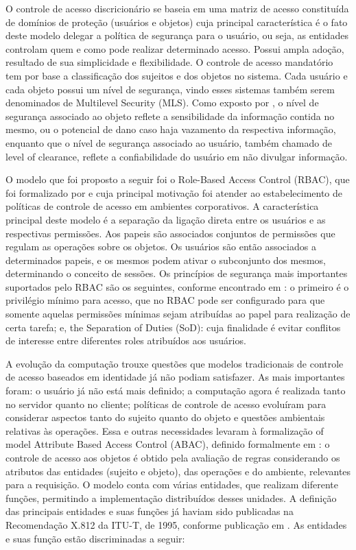 \documentclass{doublecol-new}
\begin{document}
O controle de acesso discricionário \cite{lampson1974protection} se baseia em uma matriz de acesso constituída de domínios de proteção (usuários e objetos) cuja principal característica é o fato deste modelo delegar a política de segurança para o usuário, ou seja, as entidades controlam quem e como pode realizar determinado acesso. Possui ampla adoção, resultado de sua simplicidade e flexibilidade. O controle de acesso mandatório tem por base a classificação dos sujeitos e dos objetos no sistema. Cada usuário e cada objeto possui um nível de segurança, vindo esses sistemas também serem denominados de Multilevel Security (MLS). Como exposto por \cite{sandhu1994access}, o nível de segurança associado ao objeto reflete a sensibilidade da informação contida no mesmo, ou o potencial de dano caso haja vazamento da respectiva informação, enquanto que o nível de segurança associado ao usuário, também chamado de level of clearance, reflete a confiabilidade do usuário em não divulgar informação. 

O modelo que foi proposto a seguir foi o Role-Based Access Control (RBAC), que foi formalizado por \cite{ferraiolo1992role} e cuja principal motivação foi atender ao estabelecimento de políticas de controle de acesso em ambientes corporativos. A característica principal deste modelo é a separação da ligação direta entre os usuários e as respectivas permissões. Aos papeis são associados conjuntos de permissões que regulam as operações sobre os objetos. Os usuários são então associados a determinados papeis, e os mesmos podem ativar o subconjunto dos mesmos, determinando o conceito de sessões. Os princípios de segurança mais importantes suportados pelo RBAC são os seguintes, conforme encontrado em \cite{sandhu1996role}: o primeiro é o privilégio mínimo para acesso, que no RBAC pode ser configurado para que somente aquelas permissões mínimas sejam atribuídas ao papel para realização de certa tarefa; e, the Separation of Duties (SoD): cuja finalidade é evitar conflitos de interesse entre diferentes roles atribuídos aos usuários.

A evolução da computação trouxe questões que modelos tradicionais de controle de acesso baseados em identidade já não podiam satisfazer. As mais importantes foram: o usuário já não está mais definido; a computação agora é realizada tanto no servidor quanto no cliente; políticas de controle de acesso evoluíram para considerar aspectos tanto do sujeito quanto do objeto e questões ambientais relativas às operações. Essa e outras necessidades levaram à formalização of model Attribute Based Access Control (ABAC), definido formalmente em \cite{huABAC2014guide}: o controle de acesso aos objetos é obtido pela avaliação de regras considerando os atributos das entidades (sujeito e objeto), das operações e do ambiente, relevantes para a requisição. O modelo conta com várias entidades, que realizam diferente funções, permitindo a implementação distribuídos desses unidades. A definição das principais entidades e suas funções já haviam sido publicadas na Recomendação X.812 da ITU-T, de 1995, conforme publicação em \cite{itut1996acframework}. As entidades e suas função estão discriminadas a seguir:
\end{document}
